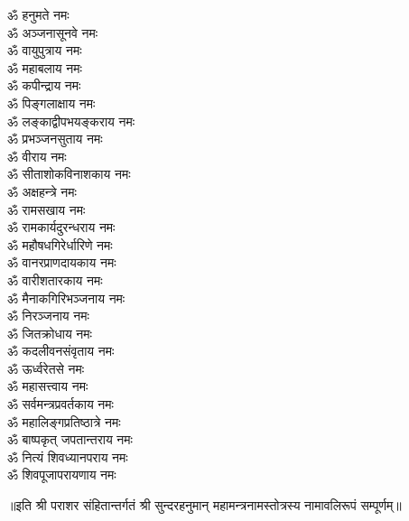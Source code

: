\begin{multicols}{2}
\begin{flushleft}
ॐ हनुमते नमः\\
ॐ अञ्जनासूनवे नमः\\
ॐ वायुपुत्राय नमः\\
ॐ महाबलाय नमः\\
ॐ कपीन्द्राय नमः\\
ॐ पिङ्गलाक्षाय नमः\\
ॐ लङ्काद्वीपभयङ्कराय नमः\\
ॐ प्रभञ्जनसुताय नमः\\
ॐ वीराय नमः\\
ॐ सीताशोकविनाशकाय नमः\hfill{}\\
ॐ अक्षहन्त्रे नमः\\
ॐ रामसखाय नमः\\
ॐ रामकार्यदुरन्धराय नमः\\
ॐ महौषधगिरेर्धारिणे नमः\\
ॐ वानरप्राणदायकाय नमः\\
ॐ वारीशतारकाय नमः\\
ॐ मैनाकगिरिभञ्जनाय नमः\\
ॐ निरञ्जनाय नमः\\
ॐ जितक्रोधाय नमः\\
ॐ कदलीवनसंवृताय नमः\hfill{}\\
ॐ ऊर्ध्वरेतसे नमः\\
ॐ महासत्त्वाय नमः\\
ॐ सर्वमन्त्रप्रवर्तकाय नमः\\
ॐ महालिङ्गप्रतिष्ठात्रे नमः\\
ॐ बाष्पकृत् जपतान्तराय नमः\\
ॐ नित्यं शिवध्यानपराय नमः\\
ॐ शिवपूजापरायणाय नमः\hfill{}\\
\end{flushleft}
\end{multicols}
\centerline{॥इति श्री पराशर संहितान्तर्गतं श्री सुन्दरहनुमान् महामन्त्रनामस्तोत्रस्य नामावलिरूपं सम्पूर्णम्॥}
